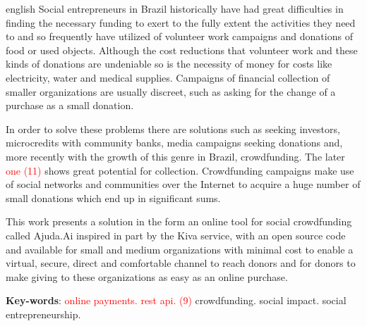 \begin{resumo}[Abstract]			%
\begin{otherlanguage*}{english}		%
Social entrepreneurs in Brazil historically have had great difficulties in finding the necessary funding to exert to the fully extent the activities they need to and so frequently have utilized of volunteer work campaigns and donations of food or used objects. Although the cost reductions that volunteer work and these kinds of donations are undeniable so is the necessity of money for costs like electricity, water and medical supplies. Campaigns of financial collection of smaller organizations are usually discreet, such as asking for the change of a purchase as a small donation.

In order to solve these problems there are solutions such as seeking investors, microcredits with community banks, media campaigns seeking donations and, more recently with the growth of this genre in Brazil, crowdfunding. The later \textcolor{red}{one (11)} shows great potential for collection. Crowdfunding campaigns make use of social networks and communities over the Internet to acquire a huge number of small donations which end up in significant sums.

This work presents a solution in the form an online tool for social crowdfunding called Ajuda.Ai inspired in part by the Kiva \cite{flannery2007kiva} service, with an open source code and available for small and medium organizations with minimal cost to enable a virtual, secure, direct and comfortable channel to reach donors and for donors to make giving to these organizations as easy as an online purchase.

\vspace{\onelineskip}
\noindent
\textbf{Key-words}: \textcolor{red}{online payments. rest api. (9)} crowdfunding. social impact. social entrepreneurship.
\end{otherlanguage*}
\end{resumo}

% 

%  
